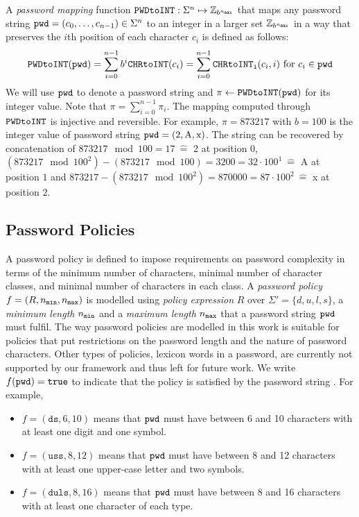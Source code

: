 A \emph{password mapping} function $\texttt{PWDtoINT}:\Sigma^n\mapsto\mathbb{Z}_{b^{{n_\mathtt{max}}}}$ that maps any password string $\mathtt{pwd}=(c_{0},\dots,c_{n-1})\in\Sigma^n$ to an integer in a larger set $\mathbb{Z}_{b^{{n_\mathtt{max}}}}$ in a way that preserves the $i$th position of each character $c_i$ is defined as follows:
\[
\texttt{PWDtoINT}(\mathtt{pwd}) = \sum_{i=0}^{n-1}b^{i} \texttt{CHRtoINT}(c_{i}) = \sum_{i=0}^{n-1}\texttt{CHRtoINT}_\texttt{i}(c_i, i) \textrm{ for } c_i\in\mathtt{pwd}
\]
We will use $\mathtt{pwd}$ to denote a password string and $\pi \gets \texttt{PWDtoINT}(\mathtt{pwd})$ for its integer value. Note that $\pi = \sum_{i=0}^{n-1}\pi_i$. %
The mapping computed through $\texttt{PWDtoINT}$ is injective and reversible. For example, $\pi = 873217$ with $b=100$ is the integer value of password string $\mathtt{pwd} = (\textrm{2},\textrm{A},\textrm{x})$. The string can be recovered by concatenation of $873217\mod 100=17~ \widehat{=}$ 2 at position 0, $(873217\mod 100^2)-(873217\mod 100)=3200=32\cdot 100^1~ \widehat{=}$ A at position $1$ and $873217-(873217\mod 100^2)=870000=87\cdot 100^2~ \widehat{=}$ x at position $2$.



\subsection{Password Policies}\label{sec:policies}
A password policy is defined to impose requirements on password complexity in terms of the minimum number of characters, minimal number of character classes, and minimal number of characters in each class.
A \emph{password policy} $f=(R,{n_\mathtt{min}},{n_\mathtt{max}})$ is modelled using \emph{policy expression} $R$ over $\Sigma'=\{d, u, l, s\}$, a \emph{minimum length} ${n_\mathtt{min}}$ and a \emph{maximum length} ${n_\mathtt{max}}$ that a password string $\mathtt{pwd}$ must fulfil.
The way password policies are modelled in this work is suitable for policies that put restrictions on the password length and the nature of password characters. Other types of policies, \eg lexicon words in a password, are currently not supported by our framework and thus left for future work.
We write $f(\mathtt{pwd})=\mathtt{true}$ to indicate that the policy is satisfied by the password string \pwd.
For example, %
\begin{itemize}
	\item $f=(\mathtt{ds}, 6, 10)$ means that $\mathtt{pwd}$ must have between 6 and 10 characters with at least one digit and one symbol.
	\item $f=(\mathtt{uss}, 8, 12)$ means that $\mathtt{pwd}$ must have between 8 and 12 characters with at least one upper-case letter and two symbols.
	\item $f=(\mathtt{duls}, 8, 16)$ means that $\mathtt{pwd}$ must have between 8 and 16 characters with at least one character of each type.
\end{itemize}

